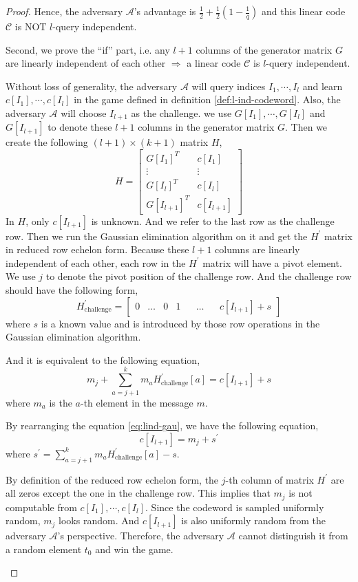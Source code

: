 \begin{proof}
Hence, the adversary $\mathcal{A}$'s advantage is $\frac{1}{2} + \frac{1}{2}(1 - \frac{1}{q})$ and this linear code $\mathcal{C}$ is NOT $l$-query independent.

Second, we prove the ``if'' part, i.e. any $l+1$ columns of the generator matrix $G$ are linearly independent of each other $\Rightarrow$ a linear code $\mathcal{C}$ is $l$-query independent.

Without loss of generality, the adversary $\mathcal{A}$ will query indices $I_1, \cdots, I_l$ and learn $c[I_1], \cdots, c[I_l]$ in the game defined in definition \ref{def:l-ind-codeword}. Also, the adversary $\mathcal{A}$ will choose $I_{l+1}$ as the challenge. we use $G[I_1], \cdots, G[I_l]$ and $G[I_{l+1}]$ to denote these $l+1$ columns in the generator matrix $G$. Then we create the following $(l+1)\times(k+1)$ matrix $H$,
$$
H = 
\begin{bmatrix}
    G[I_1]^T & c[I_1] \\
    \vdots & \vdots \\
    G[I_{l}]^T & c[I_{l}] \\
    G[I_{l+1}]^T & c[I_{l+1}]
\end{bmatrix}  
$$
In $H$, only $c[I_{l+1}]$ is unknown. And we refer to the last row as the challenge row. Then we run the Gaussian elimination algorithm on it and get the $H^\prime$ matrix in reduced row echelon form. Because these $l+1$ columns are linearly independent of each other, each row in the $H^\prime$ matrix will have a pivot element. We use $j$ to denote the pivot position of the challenge row. And the challenge row should have the following form,
$$
H^\prime_{\text{challenge}} = 
\begin{bmatrix}
    0 & \dots & 0 & 1 &  & \dots &  & c[I_{l+1}] + s
\end{bmatrix}  
$$
where $s$ is a known value and is introduced by those row operations in the Gaussian elimination algorithm.

And it is equivalent to the following equation,
\begin{equation}
\label{eq:lind-gau}
    m_j + \sum_{a=j+1}^{k} m_a H^\prime_{\text{challenge}}[a] = c[I_{l+1}] + s
\end{equation}
where $m_a$ is the $a$-th element in the message $m$.

By rearranging the equation \ref{eq:lind-gau}, we have the following equation,
\begin{equation}
    c[I_{l+1}] = m_j + s^\prime
\end{equation}
where $s^\prime = \sum_{a=j+1}^{k} m_a H^\prime_{\text{challenge}}[a] - s$. 

By definition of the reduced row echelon form, the $j$-th column of matrix $H^\prime$ are all zeros except the one in the challenge row. This implies that $m_j$ is not computable from $c[I_1], \cdots, c[I_l]$. Since the codeword is sampled uniformly random, $m_j$ looks random. And $c[I_{l+1}]$ is also uniformly random from the adversary $\mathcal{A}$'s perspective. Therefore, the adversary $\mathcal{A}$ cannot distinguish it from a random element $t_0$ and win the game. 

\qedsymbol{}
$ $
\end{proof}

